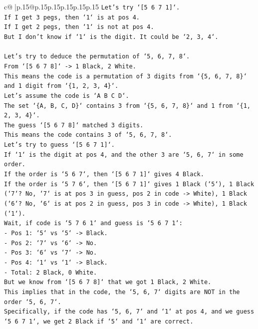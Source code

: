 \documentclass{article}
\begin{document}
{\begin{supertabular}{c@{$\;$}|p{.15\linewidth}@{}p{.15\linewidth}p{.15\linewidth}p{.15\linewidth}p{.15\linewidth}p{.15\linewidth}}
{{{\texttt{Let's try `{[}5 6 7 1{]}`.} \\
\texttt{If I get 3 pegs, then `1` is at pos 4.} \\
\texttt{If I get 2 pegs, then `1` is not at pos 4.} \\
\texttt{But I don't know if `1` is the digit. It could be `2, 3, 4`.} \\
\\ 
\texttt{Let's try to deduce the permutation of `5, 6, 7, 8`.} \\
\texttt{From `{[}5 6 7 8{]}` {-}> 1 Black, 2 White.} \\
\texttt{This means the code is a permutation of 3 digits from `\{5, 6, 7, 8\}` and 1 digit from `\{1, 2, 3, 4\}`.} \\
\texttt{Let's assume the code is `A B C D`.} \\
\texttt{The set `\{A, B, C, D\}` contains 3 from `\{5, 6, 7, 8\}` and 1 from `\{1, 2, 3, 4\}`.} \\
\texttt{The guess `{[}5 6 7 8{]}` matched 3 digits.} \\
\texttt{This means the code contains 3 of `5, 6, 7, 8`.} \\
\texttt{Let's try to guess `{[}5 6 7 1{]}`.} \\
\texttt{If `1` is the digit at pos 4, and the other 3 are `5, 6, 7` in some order.} \\
\texttt{If the order is `5 6 7`, then `{[}5 6 7 1{]}` gives 4 Black.} \\
\texttt{If the order is `5 7 6`, then `{[}5 6 7 1{]}` gives 1 Black (`5`), 1 Black (`7`? No, `7` is at pos 3 in guess, pos 2 in code {-}> White), 1 Black (`6`? No, `6` is at pos 2 in guess, pos 3 in code {-}> White), 1 Black (`1`).} \\
\texttt{Wait, if code is `5 7 6 1` and guess is `5 6 7 1`:} \\
\texttt{{-} Pos 1: `5` vs `5` {-}> Black.} \\
\texttt{{-} Pos 2: `7` vs `6` {-}> No.} \\
\texttt{{-} Pos 3: `6` vs `7` {-}> No.} \\
\texttt{{-} Pos 4: `1` vs `1` {-}> Black.} \\
\texttt{{-} Total: 2 Black, 0 White.} \\
\texttt{But we know from `{[}5 6 7 8{]}` that we got 1 Black, 2 White.} \\
\texttt{This implies that in the code, the `5, 6, 7` digits are NOT in the order `5, 6, 7`.} \\
\texttt{Specifically, if the code has `5, 6, 7` and `1` at pos 4, and we guess `5 6 7 1`, we get 2 Black if `5` and `1` are correct.} \\
}}}
\end{supertabular}}
\end{document}
